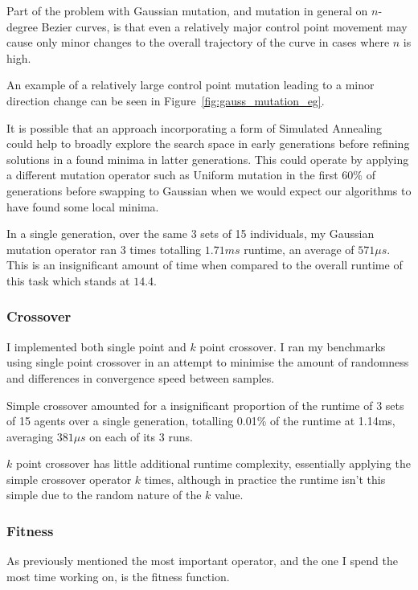 Part of the problem with Gaussian mutation, and mutation in general on $n$-degree Bezier curves, is that even a relatively major control point movement may cause only minor changes to the overall trajectory of the curve in cases where $n$ is high.

An example of a relatively large control point mutation leading to a minor direction change can be seen in Figure~\ref{fig:gauss_mutation_eg}.

It is possible that an approach incorporating a form of Simulated Annealing could help to broadly explore the search space in early generations before refining solutions in a found minima in latter generations. This could operate by applying a different mutation operator such as Uniform mutation in the first 60\% of generations before swapping to Gaussian when we would expect our algorithms to have found some local minima.

In a single generation, over the same 3 sets of 15 individuals, my Gaussian mutation operator ran 3 times totalling $1.71 ms$ runtime, an average of $571\mu s$. This is an insignificant amount of time when compared to the overall runtime of this task which stands at $14.4$.

\subsubsection{Crossover}

I implemented both single point and $k$ point crossover. I ran my benchmarks using single point crossover in an attempt to minimise the amount of randomness and differences in convergence speed between samples.

Simple crossover amounted for a insignificant proportion of the runtime of 3 sets of 15 agents over a single generation, totalling 0.01\% of the runtime at 1.14ms, averaging $381\mu s$ on each of its 3 runs.

$k$ point crossover has little additional runtime complexity, essentially applying the simple crossover operator $k$ times, although in practice the runtime isn't this simple due to the random nature of the $k$ value.


\subsubsection{Fitness}

As previously mentioned the most important operator, and the one I spend the most time working on, is the fitness function.

